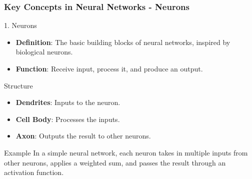 \documentclass[aspectratio=169]{beamer}
\begin{document}
\begin{frame}[fragile]
    \frametitle{Key Concepts in Neural Networks - Neurons}
    \begin{block}{1. Neurons}
        \begin{itemize}
            \item \textbf{Definition}: The basic building blocks of neural networks, inspired by biological neurons.
            \item \textbf{Function}: Receive input, process it, and produce an output.
        \end{itemize}
    \end{block}
    \begin{block}{Structure}
        \begin{itemize}
            \item \textbf{Dendrites}: Inputs to the neuron.
            \item \textbf{Cell Body}: Processes the inputs.
            \item \textbf{Axon}: Outputs the result to other neurons.
        \end{itemize}
    \end{block}
    \begin{block}{Example}
        In a simple neural network, each neuron takes in multiple inputs from other neurons, applies a weighted sum, and passes the result through an activation function.
    \end{block}
\end{frame}
\end{document}
